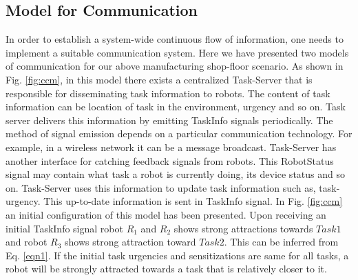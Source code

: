 \documentclass{llncs}
\begin{document}
\subsection{Model for Communication}
In order to establish a system-wide continuous flow of information, one needs to implement a suitable communication system. Here we have presented two models of communication for our above manufacturing shop-floor scenario.
As shown in Fig. \ref{fig:ccm}, in this model there exists a centralized Task-Server that is responsible for disseminating task information to robots. The content of task information can be location of task in the environment, urgency and so on. Task server delivers this information by emitting TaskInfo signals periodically. The method of signal emission depends on a particular communication technology. For example, in a wireless network it can be a message broadcast.
Task-Server has another interface for catching feedback signals from robots. This RobotStatus signal may contain what task a robot is currently doing, its device status and so on. Task-Server uses this information to update task information such as, task-urgency. This up-to-date information is sent in TaskInfo signal.
In Fig. \ref{fig:ccm} an initial configuration of this model has been presented. Upon receiving an initial TaskInfo signal robot $R_1$ and $R_2$ shows strong attractions towards $Task1$ and robot $R_3$ shows strong attraction toward $Task2$. This can be inferred from Eq. \ref{eqn1}. If the initial task urgencies and sensitizations are same for all tasks, a robot will be strongly attracted towards a task that is relatively closer to it.
\end{document}
